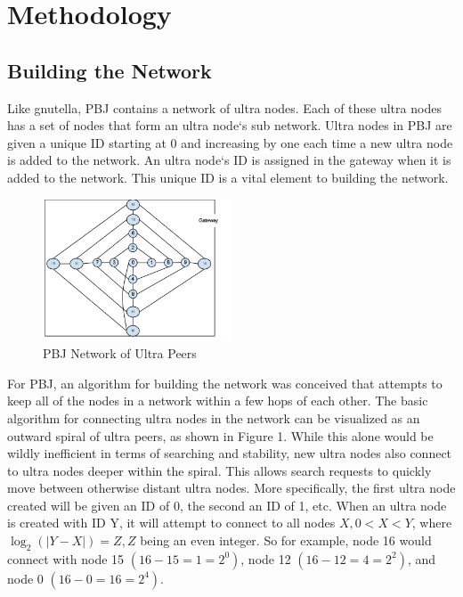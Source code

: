 \documentclass{acm_proc_article-sp}
\begin{document}
\section{Methodology}
\subsection{Building the Network}
 Like gnutella, PBJ contains a network of ultra nodes. Each of these ultra nodes has a set of nodes that form an ultra node`s sub network. Ultra nodes in PBJ are given a unique ID starting at 0 and increasing by one each time a new ultra node is added to the network. An ultra node`s ID is assigned in the gateway when it is added to the network. This unique ID is a vital element to building the network. 
 
 \begin{figure}[tbh]
\centering
\includegraphics[width=0.5\textwidth]{362prez}
\caption{PBJ Network of Ultra Peers}
\end{figure}
For PBJ, an algorithm for building the network was conceived that attempts to keep all of the nodes in a network within a few hops of each other.  The basic algorithm for connecting ultra nodes in the network can be visualized as an outward spiral of ultra peers, as shown in Figure 1.  While this alone would be wildly inefficient in terms of searching and stability, new ultra nodes also connect to ultra nodes deeper within the spiral.  This allows search requests to quickly move between otherwise distant ultra nodes. More specifically, the first ultra node created will be given an ID of 0, the second an ID of 1, etc.  When an ultra node is created with ID Y, it will attempt to connect to all nodes $X, 0 < X < Y$, where $\log_2 (|Y - X|) = Z , Z$ being an even integer.  So for example, node 16 would connect with node 15 $(16 - 15 = 1 = 2^0)$, node 12 $(16 - 12 = 4 = 2^2)$, and node 0 $(16 - 0 = 16 = 2^4)$.  
\end{document}
